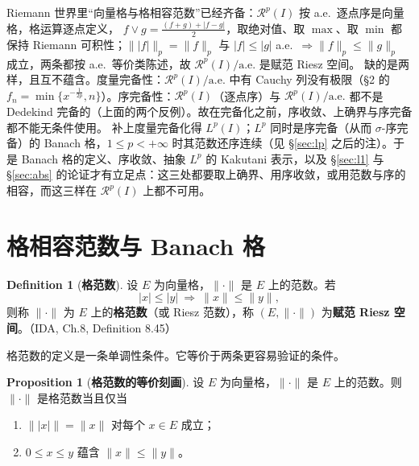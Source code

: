 \documentclass[oneside]{book}
\theoremstyle{definition}
\newcommand{\Rc}{\mathcal{R}}
\theoremstyle{definition}
\newtheorem{proposition}{Proposition}[section]
\newtheorem{definition}{Definition}[section]
\begin{document}
	\begin{link}[序线在完备化之前]
		Riemann 世界里“向量格与格相容范数”已经齐备：$\Rc^{p}(I)$ 按 a.e.\ 逐点序是向量格，格运算逐点定义，
		$f\vee g=\frac{(f+g)+|f-g|}{2}$，取绝对值、取 $\max$、取 $\min$ 都保持 Riemann 可积性；$\big\||f|\big\|_{p}=\|f\|_{p}$ 与
		$|f|\leqslant|g|$ a.e.\ $\Rightarrow\|f\|_{p}\leqslant\|g\|_{p}$ 成立，两条都按 a.e.\ 等价类陈述，故 $\Rc^{p}(I)/\mathrm{a.e.}$ 是赋范 Riesz 空间。
		缺的是两样，且互不蕴含。度量完备性：$\Rc^{p}(I)/\mathrm{a.e.}$ 中有 Cauchy 列没有极限（\S 2 的 $f_{n}=\min\{x^{-\frac1{2p}},n\}$）。序完备性：$\Rc^{p}(I)$（逐点序）与 $\Rc^{p}(I)/\mathrm{a.e.}$ 都不是 Dedekind 完备的（上面的两个反例）。故在完备化之前，序收敛、上确界与序完备都不能无条件使用。
		补上度量完备化得 $L^{p}(I)$；$L^{p}$ 同时是序完备（从而 $\sigma$-序完备）的 Banach 格，$1\leqslant p<+\infty$ 时其范数还序连续（见 \S\ref{sec:lp} 之后的注）。于是 Banach 格的定义、序收敛、抽象 $L^{p}$ 的 Kakutani 表示，以及 \S\ref{sec:l1} 与 \S\ref{sec:abs} 的论证才有立足点：这三处都要取上确界、用序收敛，或用范数与序的相容，而这三样在 $\Rc^{p}(I)$ 上都不可用。
	\end{link}
	
	\section{格相容范数与 Banach 格}
	
	\begin{definition}[\bfseries{格范数}]
		设 $E$ 为向量格，$\|\cdot\|$ 是 $E$ 上的范数。若
		\[
		|x|\leqslant|y|\ \Longrightarrow\ \|x\|\leqslant\|y\|,
		\]
		则称 $\|\cdot\|$ 为 $E$ 上的\textbf{格范数}（或 Riesz 范数），称 $(E,\|\cdot\|)$ 为\textbf{赋范 Riesz 空间}。（IDA, Ch.8, Definition 8.45）
	\end{definition}
	
	格范数的定义是一条单调性条件。它等价于两条更容易验证的条件。
	
	\begin{proposition}[\bfseries{格范数的等价刻画}]
		设 $E$ 为向量格，$\|\cdot\|$ 是 $E$ 上的范数。则 $\|\cdot\|$ 是格范数当且仅当
		\begin{enumerate}[label=(\roman*),leftmargin=2.2em,itemsep=0.1em,topsep=0.3em]
			\item $\big\||x|\big\|=\|x\|$ 对每个 $x\in E$ 成立；
			\item $0\leqslant x\leqslant y$ 蕴含 $\|x\|\leqslant\|y\|$。
		\end{enumerate}
	\end{proposition}
	
\end{document}
